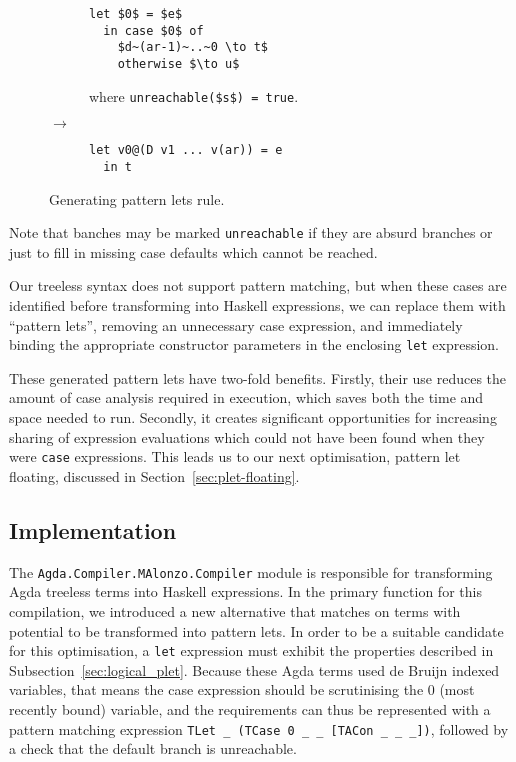 \begin{figure}[h]
\centering
\begin{subfigure}{.47\textwidth}
  \begin{lstlisting}[style=math]
  let $0$ = $e$
  in case $0$ of
    $d~(ar-1)~..~0 \to t$
    otherwise $\to u$
  \end{lstlisting}
  where \lstinline[style=math]{unreachable($s$) = true}.
\end{subfigure}
{\large$\to$}
\begin{subfigure}{.47\textwidth}
  \begin{lstlisting}[style=blockhaskell]
  let v0@(D v1 ... v(ar)) = e
  in t
  \end{lstlisting}
\end{subfigure}
\caption{Generating pattern lets rule.}
\label{fig:plet_rule}
\end{figure}

Note that banches may be marked \lstinline{unreachable} if they are absurd branches or just to fill in missing case defaults which cannot be reached.

Our treeless syntax does not support pattern matching, but when these cases are identified before transforming into Haskell expressions, we can replace them with ``pattern lets'', removing an unnecessary case expression, and immediately binding the appropriate constructor parameters in the enclosing \lstinline{let} expression.

These generated pattern lets have two-fold benefits. Firstly, their use reduces the amount of case analysis required in execution, which saves both the time and space needed to run. Secondly, it creates significant opportunities for increasing sharing of expression evaluations which could not have been found when they were \lstinline{case} expressions. This leads us to our next optimisation, pattern let floating, discussed in Section~\ref{sec:plet-floating}.

\subsection{Implementation}

The \lstinline{Agda.Compiler.MAlonzo.Compiler} module is responsible for transforming Agda treeless terms into Haskell expressions. In the primary function for this compilation, we introduced a new alternative that matches on terms with potential to be transformed into pattern lets. In order to be a suitable candidate for this optimisation, a \lstinline{let} expression must exhibit the properties described in Subsection~\ref{sec:logical_plet}. Because these Agda terms used de Bruijn indexed variables, that means the case expression should be scrutinising the 0 (most recently bound) variable, and the requirements can thus be represented with a pattern matching expression \lstinline{TLet _ (TCase 0 _ _ [TACon _ _ _])}, followed by a check that the default branch is unreachable.

